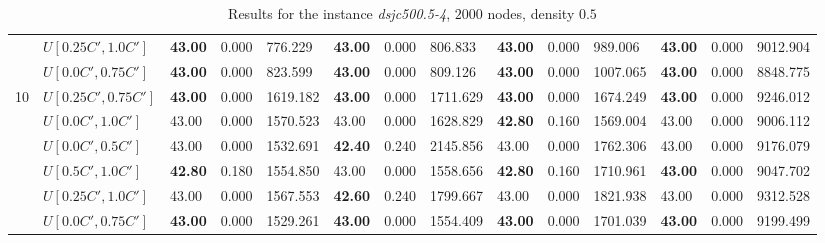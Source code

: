 \begin{table}[h]
{\begin{tabular}{|l|l||l|l|l||l|l|l||l|l|l||l|l|l|}
       & $U[0.25C',1.0C']$ & \textbf{43.00} & 0.000 & 776.229 & \textbf{43.00} & 0.000 & 806.833  & \textbf{43.00} & 0.000 & 989.006 & \textbf{43.00} & 0.000 & 9012.904\\
       & $U[0.0C',0.75C']$ & \textbf{43.00} & 0.000 & 823.599 & \textbf{43.00} & 0.000 & 809.126  & \textbf{43.00} & 0.000 & 1007.065 & \textbf{43.00} & 0.000 & 8848.775\\
      \hline\hline
      \multirow{6}{*}{10}
      & $U[0.25C',0.75C']$ & \textbf{43.00} & 0.000 & 1619.182 & \textbf{43.00} & 0.000 & 1711.629 	& \textbf{43.00} & 0.000 & 1674.249 & \textbf{43.00} & 0.000 & 9246.012\\
       & $U[0.0C',1.0C']$ & 43.00 & 0.000 & 1570.523 & 43.00 & 0.000 & 1628.829 	& \textbf{42.80} & 0.160 & 1569.004 & 43.00 & 0.000 & 9006.112\\
       & $U[0.0C',0.5C']$ & 43.00 & 0.000 & 1532.691 & \textbf{42.40} & 0.240 & 2145.856 		& 43.00 & 0.000 & 1762.306 & 43.00 & 0.000 & 9176.079\\
       & $U[0.5C',1.0C']$ & \textbf{42.80} & 0.180 & 1554.850 & 43.00 & 0.000 & 1558.656 	& \textbf{42.80} & 0.160 & 1710.961 & \textbf{43.00} & 0.000 & 9047.702\\
       & $U[0.25C',1.0C']$ & 43.00 & 0.000 & 1567.553 & \textbf{42.60} & 0.240 & 1799.667 	& 43.00 & 0.000 & 1821.938 & 43.00 & 0.000 & 9312.528\\
       & $U[0.0C',0.75C']$ & \textbf{43.00} & 0.000 & 1529.261 & \textbf{43.00} & 0.000 & 1554.409 	& \textbf{43.00} & 0.000 & 1701.039 & \textbf{43.00} & 0.000 & 9199.499\\
      \hline
      \end{tabular}
      }
      \caption{Results for the instance \textit{dsjc500.5-4}, $2000$ nodes, density $0.5$}
      \label{tab:in4}\end{table}


\clearpage

